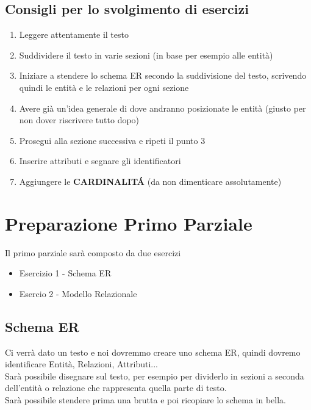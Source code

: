 \section{Consigli per lo svolgimento di esercizi}
\begin{enumerate}
    \item Leggere attentamente il testo
    \item Suddividere il testo in varie sezioni (in base per esempio alle entità)
    \item Iniziare a stendere lo schema ER secondo la suddivisione del testo,
    scrivendo quindi le entità e le relazioni per ogni sezione
    \item Avere già un'idea generale di dove andranno posizionate le entità (giusto
    per non dover riscrivere tutto dopo)
    \item Prosegui alla sezione successiva e ripeti il punto 3
    \item Inserire attributi e segnare gli identificatori
    \item Aggiungere le \textbf{CARDINALIT\'A} (da non dimenticare assolutamente)
\end{enumerate}

\chapter{Preparazione Primo Parziale}
Il primo parziale sarà composto da due esercizi
\begin{itemize}
    \item Esercizio 1 - Schema ER
    \item Esercio 2 - Modello Relazionale
\end{itemize}
\section{Schema ER}
Ci verrà dato un testo e noi dovremmo creare uno schema ER, quindi dovremo
identificare Entità, Relazioni, Attributi...
\\ Sarà possibile disegnare sul testo, per esempio per dividerlo in sezioni a seconda
dell'entità o relazione che rappresenta quella parte di testo.
\\ Sarà possibile stendere prima una brutta e poi ricopiare lo schema in bella.
